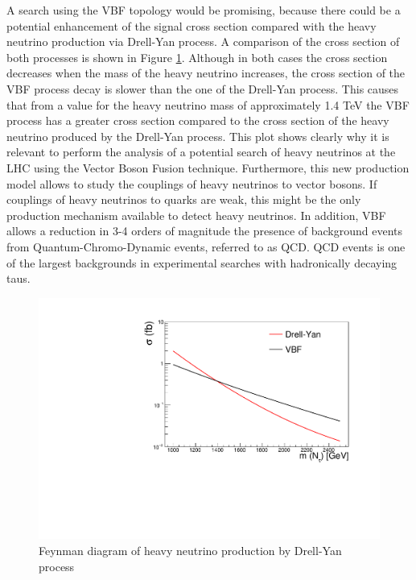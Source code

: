 A search using the VBF topology would be promising, because there could be a potential enhancement of the signal cross section compared with the heavy neutrino production via Drell-Yan process. A comparison of the cross section of both processes is shown in Figure \ref{fig: DY vs VBF}. Although in both cases the cross section decreases when the mass of the heavy neutrino increases, the cross section of the VBF process decay is slower than the one of the Drell-Yan process. This causes that from a value for the heavy neutrino mass of approximately 1.4 TeV the VBF process has a greater cross section compared to the cross section of the heavy neutrino produced by the Drell-Yan process. This plot shows clearly why it is relevant to perform the analysis of a potential search of heavy neutrinos at the LHC using the Vector Boson Fusion technique. Furthermore, this new production model allows to study the couplings of heavy neutrinos to vector bosons. If couplings of heavy neutrinos to quarks are weak, this might be the only production mechanism available to detect heavy neutrinos. In addition, VBF allows a reduction in 3-4 orders of magnitude the presence of background events from Quantum-Chromo-Dynamic events, referred to as QCD. QCD events is one of the largest backgrounds in experimental searches with hadronically decaying taus. 

\begin{figure}[H]
\centering
\includegraphics[width=\linewidth]{DY_vs_VBF_HN}
\caption{Feynman diagram of heavy neutrino production by Drell-Yan process}
\label{fig: DY vs VBF}
\end{figure}


